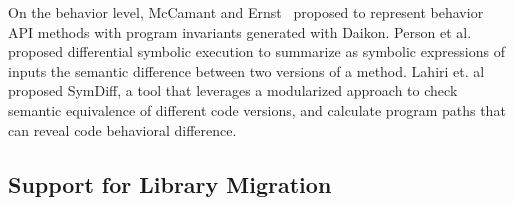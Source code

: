 
On the behavior level, McCamant and Ernst~\cite{McCamant:FSEUpgrade,McCamant:ECoopUpgrade} proposed to represent behavior API methods with program invariants generated with Daikon. Person et al.~\cite{Person:FSEDiffSE,Person:PLDIIncreSE} proposed differential symbolic execution to summarize as symbolic expressions of inputs the semantic difference between two versions of a method. Lahiri et. al~\cite{Lahiri:CAVSymDiff} proposed SymDiff, a tool that leverages a modularized approach to check semantic equivalence of different code versions, and calculate program paths that can reveal code behavioral difference.




\subsection{Support for Library Migration}

